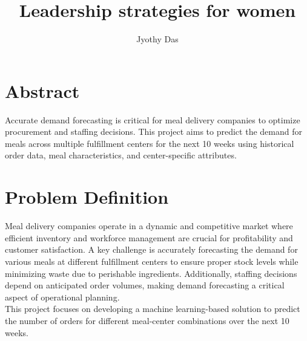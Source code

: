 \documentclass[12pt]{article}
\begin{document}

\title{\textbf{Leadership strategies for women}}

\author{ Jyothy Das}
\maketitle






\newpage
\tableofcontents
\newpage
\listoffigures
\newpage
\listoftables






\newpage
\section{Abstract}
Accurate demand forecasting is critical for meal delivery companies to optimize procurement and staffing decisions.
 This project aims to predict the demand for meals across multiple fulfillment centers for the next 10 weeks using 
historical order data, meal characteristics, and center-specific attributes. 


\newpage
\section{Problem Definition}
Meal delivery companies operate in a dynamic and competitive market where efficient inventory and workforce
 management are crucial for profitability and customer satisfaction. A key challenge is accurately forecasting the 
demand for various meals at different fulfillment centers to ensure proper stock levels while minimizing waste due 
to perishable ingredients. Additionally, staffing decisions depend on anticipated order volumes, making demand 
forecasting a critical aspect of operational planning.\\
This project focuses on developing a machine learning-based solution to predict the number of orders for different 
meal-center combinations over the next 10 weeks.
\end{document}
